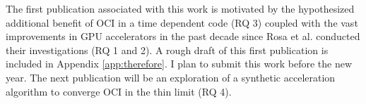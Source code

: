 The first publication associated with this work is motivated by the hypothesized additional benefit of OCI in a time dependent code (RQ 3) coupled with the vast improvements in GPU accelerators in the past decade since Rosa et al. \cite{rosa_cellwise_2013} conducted their investigations (RQ 1 and 2).
A rough draft of this first publication is included in Appendix \ref{app:therefore}.
I plan to submit this work before the new year.
The next publication will be an exploration of a synthetic acceleration algorithm to converge OCI in the thin limit (RQ 4).


